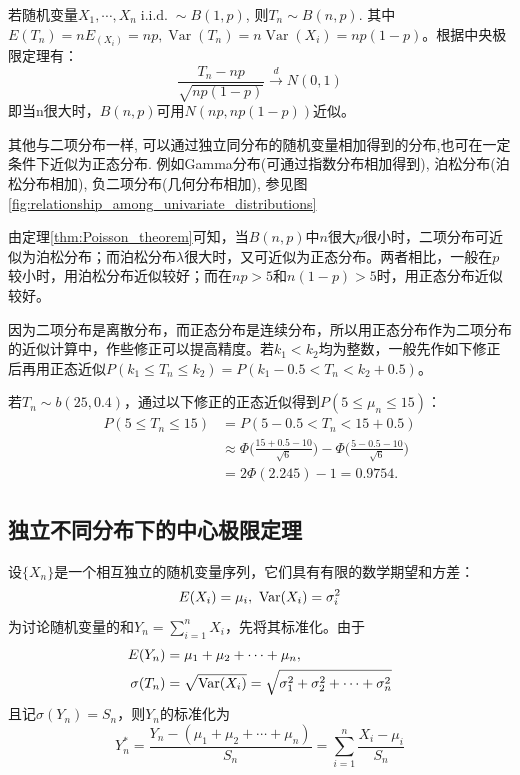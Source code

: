 \begin{corollary}
    若随机变量$X_1,\cdots ,X_n \operatorname{i.i.d.} \sim B(1,p)$, 则$T_n \sim B(n,p)$. 其中$E(T_n)=nE_(X_i)=np, \operatorname{Var}(T_n)=n\operatorname{Var}(X_i)=np(1-p)$。根据中央极限定理有：
    \[ \frac{T_n - np}{\sqrt{np(1-p)}} \xrightarrow{d} N(0,1) \]
    即当n很大时，$B(n,p)$可用$N(np,np(1-p))$近似。
\end{corollary}
\begin{remark}
    其他与二项分布一样, 可以通过独立同分布的随机变量相加得到的分布,也可在一定条件下近似为正态分布. 例如Gamma分布(可通过指数分布相加得到), 泊松分布(泊松分布相加), 负二项分布(几何分布相加), 参见图\ref{fig:relationship_among_univariate_distributions}
\end{remark}
\begin{remark}
    由定理\ref{thm:Poisson_theorem}可知，当$B(n,p)$中$n$很大$p$很小时，二项分布可近似为泊松分布；而泊松分布$\lambda$很大时，又可近似为正态分布。两者相比，一般在$p$较小时，用泊松分布近似较好；而在$np>5$和$n(1-p)>5$时，用正态分布近似较好。
\end{remark}

因为二项分布是离散分布，而正态分布是连续分布，所以用正态分布作为二项分布的近似计算中，作些修正可以提高精度。若$k_1 < k_2$均为整数，一般先作如下修正后再用正态近似$P(k_1 \leq T_n \leq k_2) = P(k_1 - 0.5 < T_n < k_2 + 0.5 )$。
\begin{example}
    若$T_n \sim b (25, 0.4)$，通过以下修正的正态近似得到$P(5 \leq \mu_n \leq 15)$：
    \begin{align*}
        P(5 \le T_n \le 15) & = P(5-0.5 < T_n < 15+0.5 )                                                                             \\
                            & \approx \Phi \biggl(\frac{15+0.5-10}{\sqrt{6}} \biggr) - \Phi \biggl(\frac{5-0.5-10}{\sqrt{6}} \biggr) \\
                            & = 2 \Phi (2.245) - 1 = 0.9754.
    \end{align*}
\end{example}

\subsection{独立不同分布下的中心极限定理}

设$\{ X_n \}$是一个相互独立的随机变量序列，它们具有有限的数学期望和方差：
\[ E(X_i) = \mu_i,\ \operatorname{Var}(X_i) = \sigma_i^2 \]
为讨论随机变量的和$Y_n = \sum_{i=1}^n X_i$，先将其标准化。由于
\begin{align*}
    E(Y_n)       & = \mu_1 + \mu_2 + \dotsb + \mu_n,                                         \\
    \sigma (T_n) & = \sqrt{\operatorname{Var}(X_i)} = \sqrt{\sigma_1^2 + \sigma_2^2 + \dotsb + \sigma_n^2}
\end{align*}
且记$\sigma(Y_n) = S_n$，则$Y_n$的标准化为
\[ Y_n^* = \frac{Y_n - (\mu_1 + \mu_2 + \dotsb + \mu_n)}{S_n} = \sum_{i=1}^n \frac{X_i - \mu_i}{S_n} \]

